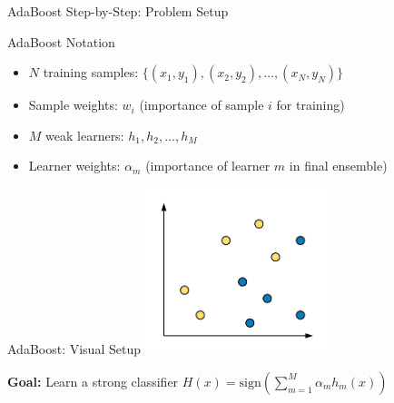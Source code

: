 \documentclass[9pt]{beamer}
\newcommand{\fitpic}[1]{\begin{adjustbox}{max width=\linewidth, max totalheight=0.78\textheight}#1\end{adjustbox}}
\begin{document}
\begin{frame}{AdaBoost Step-by-Step: Problem Setup}
\begin{definitionbox}{AdaBoost Notation}
\begin{itemize}
\item $N$ training samples: $\{(x_1, y_1), (x_2, y_2), \ldots, (x_N, y_N)\}$
\item Sample weights: $w_i$ (importance of sample $i$ for training)
\item $M$ weak learners: $h_1, h_2, \ldots, h_M$
\item Learner weights: $\alpha_m$ (importance of learner $m$ in final ensemble)
\end{itemize}
\end{definitionbox}
\end{frame}

\begin{frame}{AdaBoost: Visual Setup}
  \vspace{0.3cm}
  \centering
  \fitpic{\includegraphics[width = 0.4\textwidth]{../assets/ensemble/diagrams/ada_data}}

\begin{keypointsbox}
\textbf{Goal:} Learn a strong classifier $H(x) = \text{sign}\left(\sum_{m=1}^M \alpha_m h_m(x)\right)$
\end{keypointsbox}
\end{frame}
\end{document}
